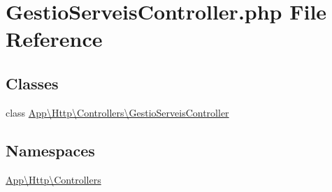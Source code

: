 \hypertarget{_gestio_serveis_controller_8php}{}\section{Gestio\+Serveis\+Controller.\+php File Reference}
\label{_gestio_serveis_controller_8php}
\subsection*{Classes}
\begin{DoxyCompactItemize}
\item 
class \mbox{\hyperlink{class_app_1_1_http_1_1_controllers_1_1_gestio_serveis_controller}{App\textbackslash{}\+Http\textbackslash{}\+Controllers\textbackslash{}\+Gestio\+Serveis\+Controller}}
\end{DoxyCompactItemize}
\subsection*{Namespaces}
\begin{DoxyCompactItemize}
\item 
 \mbox{\hyperlink{namespace_app_1_1_http_1_1_controllers}{App\textbackslash{}\+Http\textbackslash{}\+Controllers}}
\end{DoxyCompactItemize}
